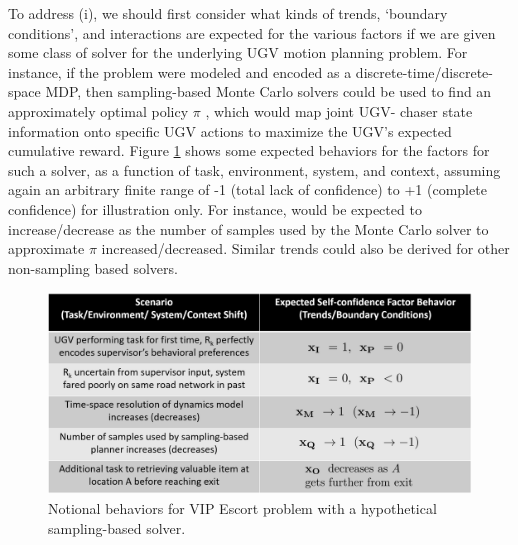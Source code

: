 To address (i), we should first consider what kinds of trends, `boundary conditions', and interactions are expected for the various factors if we are given some class of solver for the underlying UGV motion planning problem. For instance, if the problem were modeled and encoded as a discrete-time/discrete-space MDP, then sampling-based Monte Carlo solvers could be used to find an approximately optimal policy $\pi$ \cite{Browne2012-lj}, which would map joint UGV- chaser state information onto specific UGV actions to maximize the UGV's expected cumulative reward. Figure \ref{fig:trendsBCs} shows some expected behaviors for the \famsec{} factors for such a solver, as a function of task, environment, system, and context, assuming again an arbitrary finite range of -1 (total lack of confidence) to +1 (complete confidence) for illustration only. For instance, \xQ{} would be expected to increase/decrease as the number of samples used by the Monte Carlo solver to approximate $\pi$ increased/decreased. Similar trends could also be derived for other non-sampling based solvers.  %
\begin{figure}[tbp]
    \centering
    \includegraphics[width=0.99\linewidth]{Figures/scTrendsBoundaryExample.png}
    \caption{Notional \famsec{} behaviors for VIP Escort problem with a hypothetical sampling-based solver.}
    \label{fig:trendsBCs}
    \vspace{-0.5cm}
\end{figure}

